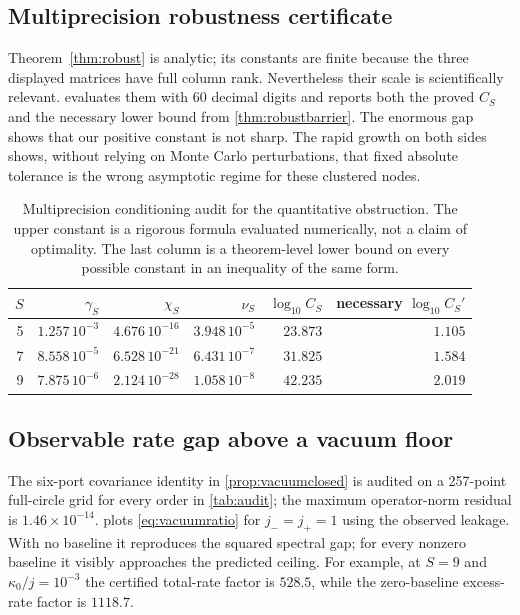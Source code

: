 \documentclass[11pt]{article}
\theoremstyle{definition}
\theoremstyle{remark}
\begin{document}
\subsection{Multiprecision robustness certificate}

Theorem~\ref{thm:robust} is analytic; its constants are finite because the
three displayed matrices have full column rank.  Nevertheless their scale is
scientifically relevant.   evaluates them with 60 decimal
digits and reports both the proved $C_S$ and the necessary lower bound from
\cref{thm:robustbarrier}.  The enormous gap shows that our positive constant
is not sharp.  The rapid growth on both sides shows, without relying on Monte
Carlo perturbations, that fixed absolute tolerance is the wrong asymptotic
regime for these clustered nodes.

\begin{table}[htbp]
\centering
\small
\setlength{\tabcolsep}{4.0pt}
\begin{tabular}{rrrrrr}
\toprule
$S$ & $\gamma_S$ & $\chi_S$ & $\nu_S$ & $\log_{10}C_S$ & necessary $\log_{10}C_S'$ \\
\midrule
5 & $1.257\,10^{-3}$ & $4.676\,10^{-16}$ & $3.948\,10^{-5}$ & $23.873$ & $1.105$ \\
7 & $8.558\,10^{-5}$ & $6.528\,10^{-21}$ & $6.431\,10^{-7}$ & $31.825$ & $1.584$ \\
9 & $7.875\,10^{-6}$ & $2.124\,10^{-28}$ & $1.058\,10^{-8}$ & $42.235$ & $2.019$ \\
\bottomrule
\end{tabular}
\caption{Multiprecision conditioning audit for the quantitative obstruction.
The upper constant is a rigorous formula evaluated numerically, not a claim of
optimality.  The last column is a theorem-level lower bound on every possible
constant in an inequality of the same form.}
\label{tab:robust}
\end{table}

\subsection{Observable rate gap above a vacuum floor}

The six-port covariance identity in \cref{prop:vacuumclosed} is audited on a
257-point full-circle grid for every order in \cref{tab:audit}; the maximum
operator-norm residual is $1.46\times10^{-14}$.
 plots \eqref{eq:vacuumratio} for $j_-=j_+=1$ using the
observed leakage.  With no baseline it reproduces the squared spectral gap;
for every nonzero baseline it visibly approaches the predicted ceiling.  For
example, at $S=9$ and $\kappa_0/j=10^{-3}$ the certified total-rate factor is
$528.5$, while the zero-baseline excess-rate factor is $1118.7$.
\end{document}
